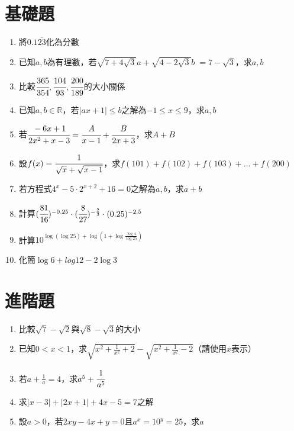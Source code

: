\documentclass[12pt,a4paper]{article}
\title{}
\author{B12508026戴偉璿}
\date{\today}
\begin{document}

\section{基礎題}
\begin{enumerate}
  \item 將$0.1\overline{23}$化為分數 \vspace{2cm}
  \item 已知$a, b$為有理數，若$\sqrt{7+4\sqrt{3}}a+\sqrt{4-2\sqrt{3}}b\;=7-\sqrt{3}$，求$a, b$\vspace{2cm}
  \item 比較$\cfrac{365}{354}, \cfrac{104}{93}, \cfrac{200}{189}$的大小關係\vspace{2cm}
  \item 已知$a, b\in\mathbb{R}$，若$|ax+1|\leq b$之解為$-1\leq x\leq 9$，求$a, b$\vspace{2cm}
  \item 若$\cfrac{-6x+1}{2x^2+x-3}=\cfrac{A}{x-1}+\cfrac{B}{2x+3}$，求$A+B$\vspace{2cm}
  \item 設$f(x)=\cfrac{1}{\sqrt{x}+\sqrt{x-1}}$，求$f(101)+f(102)+f(103)+...+f(200)$\vspace{2cm}
  \item 若方程式$4^x-5\cdot 2^{x+2}+16=0$之解為$a, b$，求$a+b$\vspace{2cm}
  \item 計算$(\cfrac{81}{16})^{-0.25}\cdot(\cfrac{8}{27})^{-\frac{2}{3}}\cdot(0.25)^{-2.5}$\vspace{2cm}
  \item 計算$10^{\log{(\log{25})}+\log{(1+\log{\frac{\log{4}}{\log{25}}})}}$\vspace{2cm}
  \item 化簡$\log{6}+log{12}-2\log{3}$\vspace{2cm}
\end{enumerate}

\section{進階題}
\begin{enumerate}
    \item 比較$\sqrt{7}-\sqrt{2}$與$\sqrt{8}-\sqrt{3}$的大小\vspace{2cm}
    \item 已知$0<x<1$，求$\sqrt{x^2+\frac{1}{x^2}+2}-\sqrt{x^2+\frac{1}{x^2}-2}$（請使用$x$表示）\vspace{2cm}
    \item 若$a+\frac{1}{a}=4$，求$a^5+\cfrac{1}{a^5}$\vspace{2cm}
    \item 求$|x-3|+|2x+1|+4x-5=7$之解\vspace{2cm}
    \item 設$a>0$，若$2xy-4x+y=0$且$a^x=10^y=25$，求$a$\vspace{2cm}
\end{enumerate}
\newpage
\end{document}
